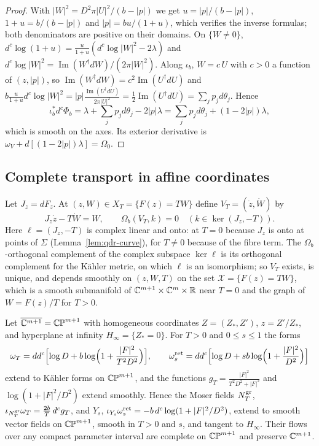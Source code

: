\begin{proof}
With $|W|^2=D^2\pi|U|^2/(b-|p|)$ we get $u=|p|/(b-|p|)$, $1+u=b/(b-|p|)$ and $|p|=bu/(1+u)$, which verifies the inverse
formulas; both denominators are positive on their domains. On $\{W\ne0\}$, $d^c\log(1+u)=\frac u{1+u}(d^c\log|W|^2-2\lambda)$ and
$d^c\log|W|^2=\operatorname{Im}(W^\dagger dW)/(2\pi|W|^2)$. Along $\iota_b$, $W=c\,U$ with $c>0$ a function of $(z,|p|)$, so
$\operatorname{Im}(W^\dagger dW)=c^2\operatorname{Im}(U^\dagger dU)$ and $b\frac u{1+u}d^c\log|W|^2=|p|\frac{\operatorname{Im}(U^\dagger dU)}{2\pi|U|^2}
=\frac12\operatorname{Im}(U^\dagger dU)=\sum_jp_jd\theta_j$. Hence
\[
 \iota_b^*d^c\Phi_b=\lambda+\sum_jp_jd\theta_j-2|p|\lambda=\sum_jp_jd\theta_j+(1-2|p|)\lambda ,
\]
which is smooth on the axes. Its exterior derivative is $\omega_V+d[(1-2|p|)\lambda]=\Omega_0$.
\end{proof}

\subsection{Complete transport in affine coordinates}\label{sec:vtr-transport}

Let $J_z=dF_z$. At $(z,W)\in X_T=\{F(z)=TW\}$ define $V_T=(\dot z,\dot W)$ by
\begin{equation}\label{eq:vtr-transport}
 J_z\dot z-T\dot W=W,\qquad
 \Omega_b(V_T,k)=0\quad(k\in\ker(J_z,-T)).
\end{equation}
Here $\ell=(J_z,-T)$ is complex linear and onto: at $T=0$ because $J_z$ is onto at points of $\Sigma$ (Lemma~\ref{lem:qdr-curve}),
for $T\ne0$ because of the fibre term. The $\Omega_b$-orthogonal complement of the complex subspace $\ker\ell$ is its orthogonal
complement for the Kähler metric, on which $\ell$ is an isomorphism; so $V_T$ exists, is unique, and depends smoothly on
$(z,W,T)$ on the set $\mathcal X=\{F(z)=TW\}$, which is a smooth submanifold of $\mathbb{C}^{m+1}\times\mathbb{C}^m\times\mathbb{R}$ near $T=0$ and the
graph of $W=F(z)/T$ for $T>0$.

\begin{lemma}\label{lem:vtr-affine-growth}
Let $\overline{\mathbb{C}^{m+1}}=\mathbb{CP}^{m+1}$ with homogeneous coordinates $Z=(Z_*,Z')$, $z=Z'/Z_*$, and hyperplane at infinity
$H_\infty=\{Z_*=0\}$. For $T>0$ and $0\le s\le1$ the forms
\[
 \omega_T=dd^c\Bigl[\log D+b\log\Bigl(1+\frac{|F|^2}{T^2D^2}\Bigr)\Bigr],\qquad
 \omega^{\rm ret}_s=dd^c\Bigl[\log D+sb\log\Bigl(1+\frac{|F|^2}{D^2}\Bigr)\Bigr]
\]
extend to Kähler forms on $\mathbb{CP}^{m+1}$, and the functions $g_T=\frac{|F|^2}{T^2D^2+|F|^2}$ and $\log(1+|F|^2/D^2)$ extend smoothly.
Hence the Moser fields $N^{\rm gr}_T$, $\iota_{N^{\rm gr}_T}\omega_T=\frac{2b}T\,d^cg_T$, and $Y_s$,
$\iota_{Y_s}\omega^{\rm ret}_s=-b\,d^c\log(1+|F|^2/D^2)$, extend to smooth vector fields on $\mathbb{CP}^{m+1}$, smooth in $T>0$ and $s$, and
tangent to $H_\infty$. Their flows over any compact parameter interval are complete on $\mathbb{CP}^{m+1}$ and preserve $\mathbb{C}^{m+1}$.
\end{lemma}

